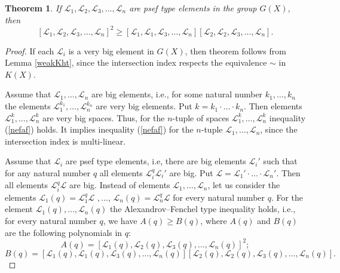 \documentclass[10pt,a4paper]{amsart}
\newtheorem{theorem}{Theorem}
\begin{document}
\begin{theorem}\label{strongKht} If $\mathcal L_1, \mathcal L_2, \mathcal L_3,\dots,\mathcal L_n$ are
psef type elements in the group $G(X)$, then
\begin{equation}\label{nefaf}
[\mathcal L_1, \mathcal L_2,\mathcal  L_3,\dots, \mathcal L_n]^2 \geq [\mathcal L_1, \mathcal L_1, \mathcal  L_3, \dots,\mathcal L_n] [ \mathcal L_2, \mathcal L_2,   \mathcal L_3, \dots, \mathcal  L_n].
\end{equation}
\end{theorem}

\begin{proof} If each  $\mathcal L_i$ is a very big element in $G(X)$, then theorem follows from Lemma \ref{weakKht}, since the intersection index respects the equivalence $\sim$ in $K(X)$.

Assume that $\mathcal L_1,\dots,\mathcal L_n$ are big elements, i.e., for some natural number $k_1,\dots,k_n$ the elements $\mathcal L_1^{k_1},\dots,\mathcal L_n^{k_n}$ are very big  elements. Put $k=k_1\cdot \ldots \cdot k_n$. Then elements $\mathcal L_1^k,\dots,\mathcal L_n^k$ are very big spaces. Thus, for the $n$-tuple of spaces $\mathcal L_1^k,\dots,\mathcal L_n^k$  inequality (\ref{nefaf}) holds. It implies inequality (\ref{nefaf}) for the $n$-tuple $\mathcal L_1,\dots,\mathcal L_n$, since the intersection index is multi-linear.


Assume that  $\mathcal L_i$ are  psef type elements, i.e, there are  big elements $\mathcal L_i'$ such that for any natural number $q$ all elements $\mathcal L_i^q\mathcal L_i'$ are  big. Put $\mathcal L=\mathcal L_1'\cdot \ldots \cdot \mathcal L_n'$. Then all elements $\mathcal L_i^q\mathcal L$ are  big.
Instead of elements
$\mathcal L_1,...,\mathcal L_n$,
let us consider the elements  $\mathcal L_1(q) =\mathcal L_1^q \mathcal L$ $,\dots$,   $\mathcal L_n(q) =\mathcal L_n^q \mathcal L$
for every  natural number  $q$. For the element $\mathcal L_1(q),\dots, \mathcal L_n(q)$ the Alexandrov--Fenchel type inequality holds, i.e., for every natural number $q$, we  have $A(q)\geq B(q)$, where $A(q)$ and $B(q)$ are the following polynomials in $q$:
\begin{equation*}A(q)=[\mathcal L_1(q),\mathcal L_2(q),\mathcal  L_3(q),\dots,\mathcal  L_n(q)]^2; \end{equation*}  \begin{equation*}B(q)= [\mathcal L_1(q), \mathcal L_1(q), \mathcal  L_3(q), \dots,\mathcal L_n(q)][\mathcal L_2(q), \mathcal L_2(q), \mathcal L_3 (q), \dots, \mathcal  L_n (q)].\end{equation*}



\end{proof}
\end{document}
